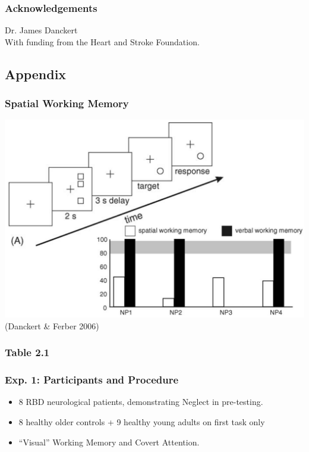 \documentclass{beamer}
\begin{document}
\begin{frame}
	\frametitle{Acknowledgements}
	Dr. James Danckert\\
	With funding from the Heart and Stroke Foundation.
\end{frame}


\subsection*{Appendix}


\begin{frame}[noframenumbering]
	\frametitle{Table 2.1}
\end{frame}

\begin{frame}[noframenumbering]
\frametitle{Exp. 1: Participants and Procedure}
\begin{itemize}
	\item 8 RBD neurological patients, demonstrating Neglect in pre-testing.
	\item 8 healthy older controls + 9 healthy young adults on first task only
	\item ``Visual'' Working Memory and Covert Attention.
\end{itemize}
\end{frame}
\end{document}
